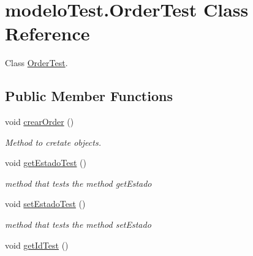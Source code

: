 \hypertarget{classmodelo_test_1_1_order_test}{}\section{modelo\+Test.\+Order\+Test Class Reference}
\label{classmodelo_test_1_1_order_test}


Class \mbox{\hyperlink{classmodelo_test_1_1_order_test}{Order\+Test}}.  


\subsection*{Public Member Functions}
\begin{DoxyCompactItemize}
\item 
\mbox{\label{classmodelo_test_1_1_order_test_aef8b55bb4107f5ee25b4c187b2fdb069}} 
void \mbox{\hyperlink{classmodelo_test_1_1_order_test_aef8b55bb4107f5ee25b4c187b2fdb069}{crear\+Order}} ()
\begin{DoxyCompactList}\small\item\em Method to cretate objects. \end{DoxyCompactList}\item 
\mbox{\label{classmodelo_test_1_1_order_test_a5a7f78b4f7439d54e6e5f0749fd6e61c}} 
void \mbox{\hyperlink{classmodelo_test_1_1_order_test_a5a7f78b4f7439d54e6e5f0749fd6e61c}{get\+Estado\+Test}} ()
\begin{DoxyCompactList}\small\item\em method that tests the method get\+Estado \end{DoxyCompactList}\item 
\mbox{\label{classmodelo_test_1_1_order_test_a64399d59db1a5ae848057cfc758a3bf3}} 
void \mbox{\hyperlink{classmodelo_test_1_1_order_test_a64399d59db1a5ae848057cfc758a3bf3}{set\+Estado\+Test}} ()
\begin{DoxyCompactList}\small\item\em method that tests the method set\+Estado \end{DoxyCompactList}\item 
\mbox{\label{classmodelo_test_1_1_order_test_a7ecc657c6d15ff0a17680bf9f694f7aa}} 
void \mbox{\hyperlink{classmodelo_test_1_1_order_test_a7ecc657c6d15ff0a17680bf9f694f7aa}{get\+Id\+Test}} ()

\end{DoxyCompactItemize}
